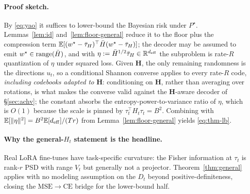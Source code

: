 \paragraph{Proof sketch.} By \eqref{eq:yao} it suffices to lower-bound
the Bayesian risk under $P^\star$. Lemmas~\ref{lem:id}
and~\ref{lem:floor-general} reduce it to the floor plus the
compression term $\mathbb{E}[(w^\star-\bar{\tau}_H)^\top\bar H(w^\star-\bar{\tau}_H)]$; the
decoder may be assumed to emit $w^\star \in \operatorname{range}(\bar H)$, and with
$\eta := \bar H^{1/2}\bar{\tau}_H \in \mathbb{R}^{d_{\mathrm{eff}}}$ the subproblem is rate-$R$
quantization of $\eta$ under squared loss. Given $\boldsymbol H$, the
only remaining randomness is the directions $u_t$, so a conditional
Shannon converse applies to every rate-$R$ code, \emph{including
codebooks adapted to $\boldsymbol H$}: conditioning on
$\boldsymbol H$, rather than averaging over rotations, is what makes
the converse valid against the $\boldsymbol H$-aware decoder of
\S\ref{sec:achv}; the constant absorbs the entropy-power-to-variance
ratio of $\eta$, which is $O(1)$ because the scale is pinned by
$\tau_t^\top H_t \tau_t = B^2$. Combining with
$\mathbb{E}[\|\eta\|^2] = B^2\mathbb{E}[d_{\mathrm{eff}}]/(Tr)$ from
Lemma~\ref{lem:floor-general} yields \eqref{eq:thm-lb}.

\paragraph{Why the general-$H_t$ statement is the headline.} Real LoRA
fine-tunes have task-specific curvature: the Fisher information at
$\tau_t$ is rank-$r$ PSD with range $V_t$ but generally not a
projector. Theorem~\ref{thm:general} applies with no modeling
assumption on the $D_t$ beyond positive-definiteness, closing the
$\mathrm{MSE}\to\mathrm{CE}$ bridge for the lower-bound half.
